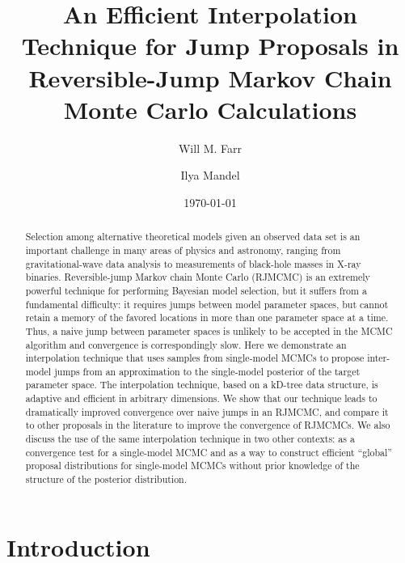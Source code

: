\documentclass[prd,preprint]{revtex4}
\begin{document}
\title{An Efficient Interpolation Technique for Jump Proposals in
  Reversible-Jump Markov Chain Monte Carlo Calculations}

\date{\today}

\author{Will M. Farr}


\author{Ilya Mandel}


\begin{abstract}
  Selection among alternative theoretical models given an observed
  data set is an important challenge in many areas of physics and
  astronomy, ranging from gravitational-wave data analysis to
  measurements of black-hole masses in X-ray binaries.
  Reversible-jump Markov chain Monte Carlo (RJMCMC) is an extremely
  powerful technique for performing Bayesian model selection, but it
  suffers from a fundamental difficulty: it requires jumps between
  model parameter spaces, but cannot retain a memory of the favored
  locations in more than one parameter space at a time.  Thus, a naive
  jump between parameter spaces is unlikely to be accepted in the MCMC
  algorithm and convergence is correspondingly slow.  Here we
  demonstrate an interpolation technique that uses samples from
  single-model MCMCs to propose inter-model jumps from an
  approximation to the single-model posterior of the target parameter
  space.  The interpolation technique, based on a kD-tree data
  structure, is adaptive and efficient in arbitrary dimensions.  We
  show that our technique leads to dramatically improved convergence
  over naive jumps in an RJMCMC, and compare it to other proposals in
  the literature to improve the convergence of RJMCMCs.  We also
  discuss the use of the same interpolation technique in two other
  contexts: as a convergence test for a single-model MCMC and as a way
  to construct efficient ``global'' proposal distributions for
  single-model MCMCs without prior knowledge of the structure of the
  posterior distribution.
\end{abstract}

\maketitle

\section{Introduction}
\end{document}

